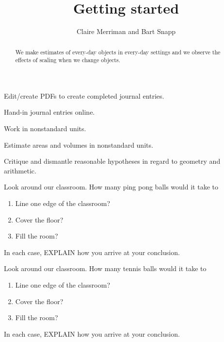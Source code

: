 \documentclass[handout,noauthor,nooutcomes,hints]{ximera}
\title{Getting started}
\author{Claire Merriman and Bart Snapp}
\begin{document}
\begin{abstract}
  We make estimates of every-day objects in every-day settings and we
  observe the effects of scaling when we change objects.
\end{abstract}
\maketitle



\begin{listOutcomes}
\item{Edit/create PDFs to create completed journal entries.}
\item{Hand-in journal entries online.}
\item{Work in nonstandard units.}
\item{Estimate areas and volumes in nonstandard units.}
\item{Critique and dismantle reasonable hypotheses in regard to geometry and arithmetic.}
\end{listOutcomes}

\mynewpage

\begin{question}
Look around our classroom. How many ping pong balls would it take to
\begin{enumerate}
\item Line one edge of the classroom?
\item Cover the floor?
\item Fill the room?
\end{enumerate}
In each case, EXPLAIN how you arrive at your conclusion.



\end{question}
\mynewpage

\begin{question}
Look around our classroom. How many tennis balls would it take to
\begin{enumerate}
\item Line one edge of the classroom?
 \item Cover the floor?
 \item Fill the room?
\end{enumerate}
In each case, EXPLAIN how you arrive at your conclusion.
\end{question}
\end{document}
